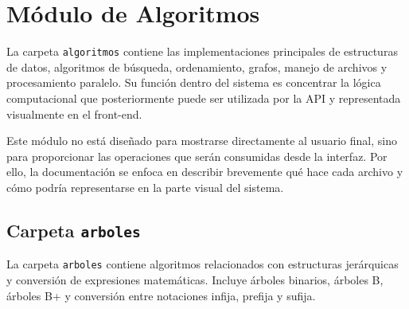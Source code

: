 \documentclass[12pt]{article}
\begin{document}
	
	\section{Módulo de Algoritmos}
	
	La carpeta \texttt{algoritmos} contiene las implementaciones principales de estructuras de datos, algoritmos de búsqueda, ordenamiento, grafos, manejo de archivos y procesamiento paralelo. Su función dentro del sistema es concentrar la lógica computacional que posteriormente puede ser utilizada por la API y representada visualmente en el front-end.
	
	Este módulo no está diseñado para mostrarse directamente al usuario final, sino para proporcionar las operaciones que serán consumidas desde la interfaz. Por ello, la documentación se enfoca en describir brevemente qué hace cada archivo y cómo podría representarse en la parte visual del sistema.
	
	\subsection{Carpeta \texttt{arboles}}
	
	La carpeta \texttt{arboles} contiene algoritmos relacionados con estructuras jerárquicas y conversión de expresiones matemáticas. Incluye árboles binarios, árboles B, árboles B+ y conversión entre notaciones infija, prefija y sufija.
	
\end{document}
